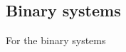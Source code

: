 \documentclass[../../main/thesis_msc.tex]{subfiles}
\begin{document}
    				\subsection{Binary systems}
    				
    					For the binary systems
    
    
    
    
\end{document}
